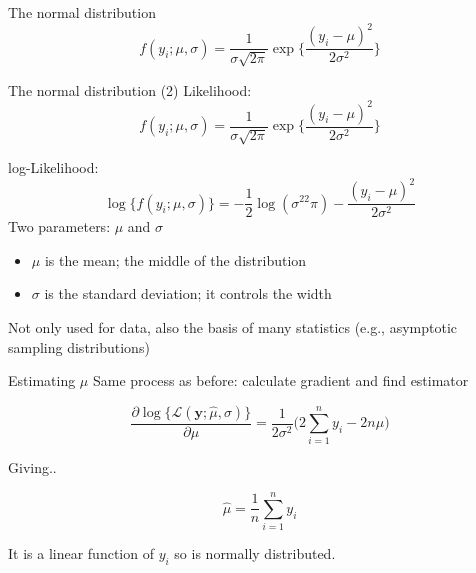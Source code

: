 \documentclass[
  ignorenonframetext,
]{beamer}
\providecommand{\tightlist}{%
  \setlength{\itemsep}{0pt}\setlength{\parskip}{0pt}}
\begin{document}
\begin{frame}{The normal distribution}
\protect\hypertarget{the-normal-distribution}{}
\begin{equation}
f(y_i;\mu, \sigma) = \frac{1}{\sigma\sqrt{2\pi}}\exp\biggl\{\frac{(y_i-\mu)^2}{2\sigma^2}\biggr\}
\end{equation}
\end{frame}

\begin{frame}{The normal distribution (2)}
\protect\hypertarget{the-normal-distribution-2}{}
Likelihood: \begin{equation}
f(y_i;\mu, \sigma) = \frac{1}{\sigma\sqrt{2\pi}}\exp\biggl\{\frac{(y_i-\mu)^2}{2\sigma^2}\biggr\}
\end{equation}

log-Likelihood: \begin{equation}
\log\{f(y_i;\mu, \sigma)\} = -\frac{1}{2}\log(\sigma^22\pi) -\frac{(y_i-\mu)^2}{2\sigma^2}
\end{equation} Two parameters: \(\mu\) and \(\sigma\)

\begin{itemize}
\tightlist
\item
  \(\mu\) is the mean; the middle of the distribution
\item
  \(\sigma\) is the standard deviation; it controls the width
\end{itemize}

Not only used for data, also the basis of many statistics (e.g.,
asymptotic sampling distributions)
\end{frame}

\begin{frame}{Estimating \(\mu\)}
\protect\hypertarget{estimating-mu}{}
Same process as before: calculate gradient and find estimator

\begin{equation}
\frac{\partial\log\{\mathcal{L}(\textbf{y};\hat{\mu},\sigma)\}}{\partial\mu} = \frac{1}{2\sigma^2}\biggl(2\sum \limits^n_{i=1}y_i-2n\mu\biggl)
\end{equation}

Giving..

\begin{equation}
\hat{\mu} = \frac{1}{n}\sum \limits^n_{i=1}y_i
\end{equation}

It is a linear function of \(y_i\) so is normally distributed.
\end{frame}
\end{document}
